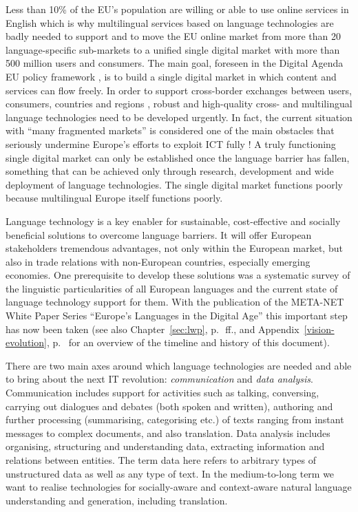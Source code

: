 \documentclass[10pt, plain]{../../metanetpaper}
\begin{document}
\begin{multicols}{2}
Less than 10\% of the EU's population are willing or able to use online services in English which is why multilingual services based on language technologies are badly needed to support and to move the EU online market from more than 20 language-specific sub-markets to a unified single digital market with more than 500 million users and consumers. The main goal, foreseen in the Digital Agenda EU policy framework \cite{DA2010}, is to build a single digital market in which content and services can flow freely. In order to support cross-border exchanges between users, consumers, countries and regions \cite{economist12}, robust and high-quality cross- and multilingual language technologies need to be developed urgently. In fact, the current situation with ``many fragmented markets'' is considered one of the main obstacles that seriously undermine Europe's efforts to exploit ICT fully \cite{DA2010}! A truly functioning single digital market can only be established once the language barrier has fallen, something that can be achieved only through research, development and wide deployment of language technologies. The single digital market functions poorly because multilingual Europe itself functions poorly.

Language technology is a key enabler for sustainable, cost-effective and socially beneficial solutions to overcome language barriers. It will offer European stakeholders tremendous advantages, not only within the European market, but also in trade relations with non-European countries, especially emerging economies. One prerequisite to develop these solutions was a systematic survey of the linguistic particularities of all European languages and the current state of language technology support for them. With the publication of the META-NET White Paper Series ``Europe's Languages in the Digital Age'' \cite{LWP2012} this important step has now been taken (see also Chapter~\ref{sec:lwp}, p.~\pageref{sec:lwp}\,ff., and Appendix~\ref{vision-evolution}, p.~\pageref{vision-evolution} for an overview of the timeline and history of this document).

There are two main axes around which language technologies are needed and able to bring about the next IT revolution: \emph{communication} and \emph{data analysis}. Communication includes support for activities such as talking, conversing, carrying out dialogues and debates (both spoken and written), authoring and further processing (summarising, categorising etc.) of texts ranging from instant messages to complex documents, and also translation. Data analysis includes organising, structuring and understanding data, extracting information and relations between entities. The term data here refers to arbitrary types of unstructured data as well as any type of text. In the medium-to-long term we want to realise technologies for socially-aware and context-aware natural language understanding and generation, including translation.


\end{multicols}
\end{document}
